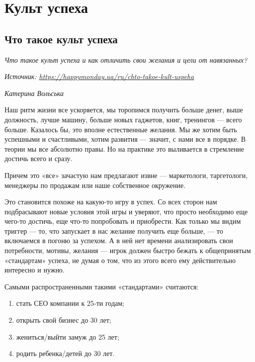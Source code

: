 \chapter{Культ успеха}

\section{Что такое культ успеха}

\textit{Что такое культ успеха и как отличить свои желания и цели от навязанных?}

\textit{Источник: \url{https://happymonday.ua/ru/chto-takoe-kult-uspeha}}

\textit{Катерина Вольська}

Наш ритм жизни все ускоряется, мы торопимся получить больше денег, выше должность, лучше машину, больше новых гаджетов, книг, тренингов — всего больше. Казалось бы, это вполне естественные желания. Мы же хотим быть успешными и счастливыми, хотим развития — значит, с нами все в порядке. В теории мы все абсолютно правы. Но на практике это выливается в стремление достичь всего и сразу.

\begin{fancyquotes}
    Причем это «все» зачастую нам предлагают извне  — маркетологи, таргетологи, менеджеры по продажам или наше собственное окружение.
\end{fancyquotes}

Это становится похоже на какую-то игру в успех. Со всех сторон нам подбрасывают новые условия этой игры и уверяют, что просто необходимо еще чего-то достичь, еще что-то попробовать и приобрести. Как только мы видим триггер — то, что запускает в нас желание получить еще больше, — то включаемся в погоню за успехом. А в ней нет времени анализировать свои потребности, мотивы, желания — игрок должен быстро бежать к общепринятым «стандартам» успеха, не думая о том, что из этого всего ему действительно интересно и нужно.

Самыми распространенными такими «стандартами» считаются:

\begin{enumerate}
    \item стать СЕО компании к 25-ти годам;
    \item открыть свой бизнес до 30 лет;
    \item жениться/выйти замуж до 25 лет;
    \item родить ребенка/детей до 30 лет.
\end{enumerate}

